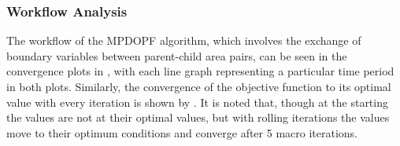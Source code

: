\documentclass[../../outputs/main.tex]{subfiles}
\begin{document}
\subsubsection{Workflow Analysis}
The workflow of the MPDOPF algorithm, which involves the exchange of boundary variables between parent-child area pairs, can be seen in the convergence plots in , with each line graph representing a particular time period in both plots. Similarly, the convergence of the objective function to its optimal value with every iteration is shown by . It is noted that, though at the starting the values are not at their optimal values, but with rolling iterations the values move to their optimum conditions and converge after 5 macro iterations. 

    
\end{document}
